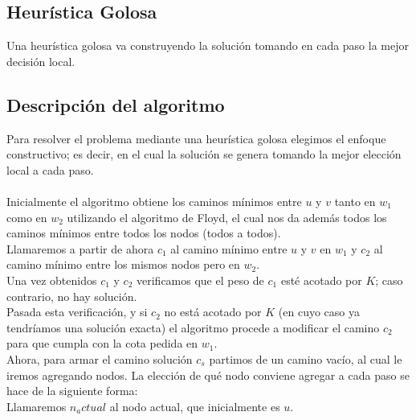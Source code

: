 \subsection{Heur\'istica Golosa}

Una heur\'istica golosa va construyendo la soluci\'on tomando en cada paso la mejor decisi\'on local.

\subsection{Descripci\'on del algoritmo}

Para resolver el problema mediante una heur\'istica golosa elegimos el enfoque constructivo; es decir, en el cual la soluci\'on se genera tomando la mejor elecci\'on local a cada paso.\\\\

Inicialmente el algoritmo obtiene los caminos m\'inimos entre $u$ y $v$ tanto en $w_1$ como en $w_2$ utilizando el algoritmo de Floyd, el cual nos da adem\'as todos los caminos m\'inimos entre todos los nodos (todos a todos).\\
Llamaremos a partir de ahora $c_1$ al camino m\'inimo entre $u$ y $v$ en $w_1$ y $c_2$ al camino m\'inimo entre los mismos nodos pero en $w_2$.\\
Una vez obtenidos $c_1$ y $c_2$ verificamos que el peso de $c_1$ est\'e acotado por $K$; caso contrario, no hay soluci\'on.\\
Pasada esta verificaci\'on, y si $c_2$ no est\'a acotado por $K$ (en cuyo caso ya tendr\'iamos una soluci\'on exacta) el algoritmo procede a modificar el camino $c_2$ para que cumpla con la cota pedida en $w_1$.\\
Ahora, para armar el camino soluci\'on $c_s$ partimos de un camino vac\'io, al cual le iremos agregando nodos. La elecci\'on de qu\'e nodo conviene agregar a cada paso se hace de la siguiente forma:\\
Llamaremos $n_actual$ al nodo actual, que inicialmente es $u$.\\


